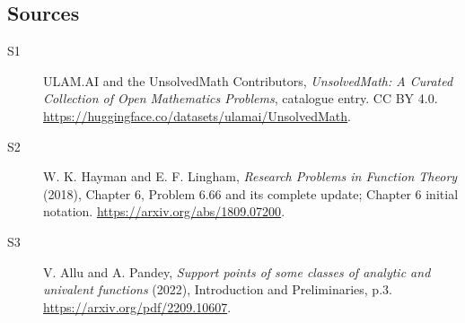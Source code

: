\documentclass[11pt]{article}
\begin{document}
\subsection{Sources}
\begin{description}
\item[\hypertarget{source:statement:1}{S1}] ULAM.AI and the UnsolvedMath Contributors, \emph{UnsolvedMath: A Curated Collection of Open Mathematics Problems}, catalogue entry. CC BY 4.0. \url{https://huggingface.co/datasets/ulamai/UnsolvedMath}.
\item[\hypertarget{source:statement:2}{S2}] W. K. Hayman and E. F. Lingham, \emph{Research Problems in Function Theory} (2018), Chapter 6, Problem 6.66 and its complete update; Chapter 6 initial notation. \url{https://arxiv.org/abs/1809.07200}.
\item[\hypertarget{source:statement:3}{S3}] V. Allu and A. Pandey, \emph{Support points of some classes of analytic and univalent functions} (2022), Introduction and Preliminaries, p.3. \url{https://arxiv.org/pdf/2209.10607}.
\end{description}
\label{end:statement}
\end{document}

